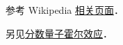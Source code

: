 
\begin{issues}
\issueDraft
\end{issues}

参考 Wikipedia \href{https://en.wikipedia.org/wiki/Quantum_Hall_effect}{相关页面}．

另见\href{https://en.jinzhao.wiki/wiki/Fractional_quantum_Hall_effect}{分数量子霍尔效应}．
